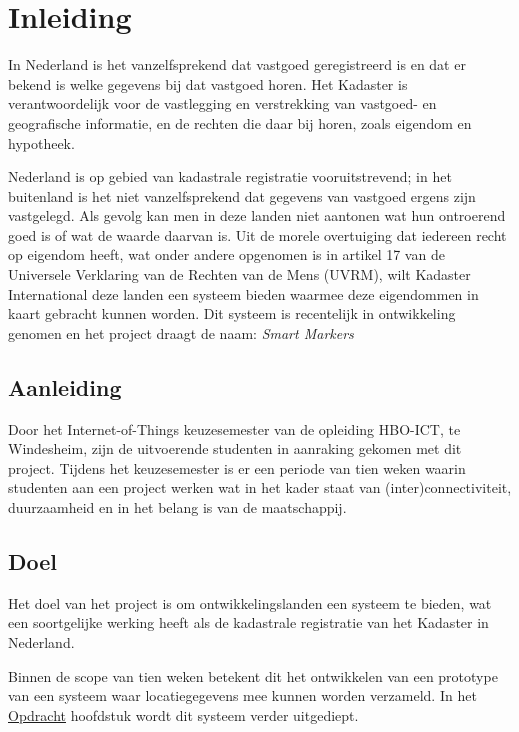 \section{Inleiding}
\label{sec:inleiding}
In Nederland is het vanzelfsprekend dat vastgoed geregistreerd is en dat er bekend
is welke gegevens bij dat vastgoed horen. Het Kadaster is verantwoordelijk voor de
vastlegging en verstrekking van vastgoed- en geografische informatie, en de rechten
die daar bij horen, zoals eigendom en hypotheek.

Nederland is op gebied van kadastrale registratie vooruitstrevend; in het buitenland
is het niet vanzelfsprekend dat gegevens van vastgoed ergens zijn vastgelegd.
Als gevolg kan men in deze landen niet aantonen wat hun ontroerend goed is of wat
de waarde daarvan is.
Uit de morele overtuiging dat iedereen recht op eigendom heeft, wat onder andere
opgenomen is in artikel 17 van de Universele Verklaring van de Rechten van
de Mens (UVRM), wilt Kadaster International deze landen een systeem bieden waarmee
deze eigendommen in kaart gebracht kunnen worden. Dit systeem is recentelijk in
ontwikkeling genomen en het project draagt de naam: \textit{Smart Markers}

\subsection{Aanleiding}
Door het Internet-of-Things keuzesemester van de opleiding HBO-ICT, te Windesheim,
zijn de uitvoerende studenten in aanraking gekomen met dit project. Tijdens het
keuzesemester is er een periode van tien weken waarin studenten aan een project
werken wat in het kader staat van (inter)connectiviteit, duurzaamheid en in het
belang is van de maatschappij.

\subsection{Doel}
Het doel van het project is om ontwikkelingslanden een systeem te bieden, wat
een soortgelijke werking heeft als de kadastrale registratie van het Kadaster
in Nederland.

Binnen de scope van tien weken betekent dit het ontwikkelen van een prototype
van een systeem waar locatiegegevens mee kunnen worden verzameld. In het
\hyperref[sec:opdracht]{Opdracht} hoofdstuk wordt dit systeem verder uitgediept.
